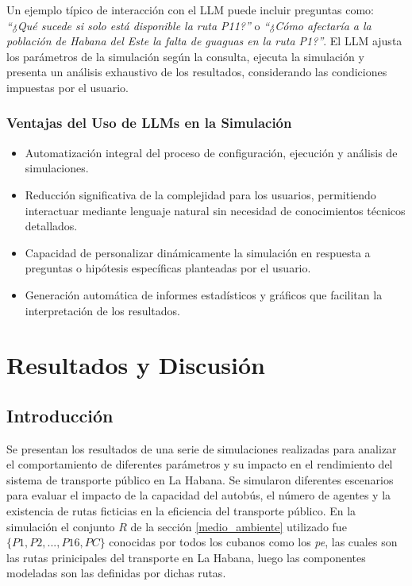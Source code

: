 \documentclass[a4paper,12pt]{article}
\begin{document}
Un ejemplo típico de interacción con el LLM puede incluir preguntas como: \textit{“¿Qué sucede si solo está disponible la ruta P11?”} o \textit{“¿Cómo afectaría a la población de Habana del Este la falta de guaguas en la ruta P1?”}. El LLM ajusta los parámetros de la simulación según la consulta, ejecuta la simulación y presenta un análisis exhaustivo de los resultados, considerando las condiciones impuestas por el usuario.

\subsubsection{Ventajas del Uso de LLMs en la Simulación}
\begin{itemize}
    \item Automatización integral del proceso de configuración, ejecución y análisis de simulaciones.
    \item Reducción significativa de la complejidad para los usuarios, permitiendo interactuar mediante lenguaje natural sin necesidad de conocimientos técnicos detallados.
    \item Capacidad de personalizar dinámicamente la simulación en respuesta a preguntas o hipótesis específicas planteadas por el usuario.
    \item Generación automática de informes estadísticos y gráficos que facilitan la interpretación de los resultados.
\end{itemize}




\section{Resultados y Discusi\'on}

\subsection{Introducción}

Se presentan los resultados de una serie de simulaciones realizadas para analizar el comportamiento de diferentes parámetros y su impacto en el rendimiento del sistema de transporte público en La Habana. Se simularon diferentes escenarios para evaluar el impacto de la capacidad del autobús, el número de agentes y la existencia de rutas ficticias en la eficiencia del transporte público. En la simulaci\'on el conjunto $R$ de la secci\'on \ref{medio_ambiente}  utilizado fue $\{P1,P2,...,P16,PC\}$ conocidas por todos los cubanos como los \textit{pe}, las cuales son las rutas prinicipales del transporte en La Habana, luego las componentes modeladas son las definidas por dichas rutas.
\end{document}
